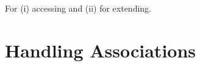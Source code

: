 For (i) accessing and (ii) for extending. 

\section{Handling Associations}
\label{sec:rgcassoc}









 



